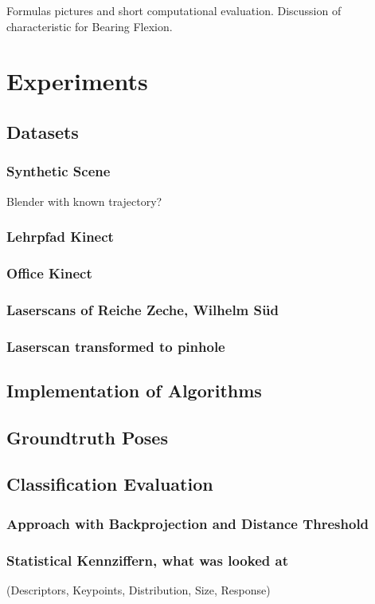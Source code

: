 Formulas pictures and short computational evaluation.
Discussion of characteristic for Bearing Flexion.

\section{Experiments}

\subsection{Datasets}
\subsubsection{Synthetic Scene}
Blender with known trajectory?
\subsubsection{Lehrpfad Kinect}
\subsubsection{Office Kinect}
\subsubsection{Laserscans of Reiche Zeche, Wilhelm Süd}
\subsubsection{Laserscan transformed to pinhole}

\subsection{Implementation of Algorithms}
\subsection{Groundtruth Poses}
\subsection{Classification Evaluation}
\subsubsection{Approach with Backprojection and Distance Threshold}
\subsubsection{Statistical Kennziffern, what was looked at}
(Descriptors, Keypoints, Distribution, Size, Response)
